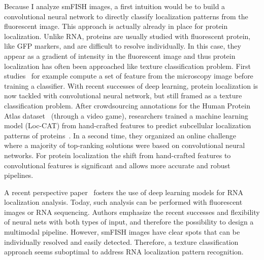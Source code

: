 Because I analyze smFISH images, a first intuition would be to build a convolutional neural network to directly classify localization patterns from the fluorescent image.
This approach is actually already in place for protein localization.
Unlike RNA, proteins are usually studied with fluorescent protein, like \ac{GFP} markers, and are difficult to resolve individually.
In this case, they appear as a gradient of intensity in the fluorescent image and thus protein localization has often been approached like texture classification problem.
First studies~\cite{boland_automated_1998} for example compute a set of feature from the microscopy image before training a classifier.
With recent successes of deep learning, protein localization is now tackled with convolutional neural network, but still framed as a texture classification problem.
After crowdsourcing annotations for the Human Protein Atlas dataset~\cite{Uhlen_2015} (through a video game), researchers trained a machine learning model (Loc-CAT) from hand-crafted features to predict subcellular localization patterns of proteins~\cite{sullivan_deep_2018}.
In a second time, they organized an online challenge~\cite{ouyang_analysis_2019} where a majority of top-ranking solutions were based on convolutional neural networks.
For protein localization the shift from hand-crafted features to convolutional features is significant and allows more accurate and robust pipelines.

A recent perspective paper~\cite{Savulescu_2021} fosters the use of deep learning models for RNA localization analysis.
Today, such analysis can be performed with fluorescent images or RNA sequencing.
Authors emphasize the recent successes and flexibility of neural nets with both types of input, and therefore the possibility to design a multimodal pipeline.
However, smFISH images have clear spots that can be individually resolved and easily detected.
Therefore, a texture classification approach seems suboptimal to address \ac{RNA} localization pattern recognition.


